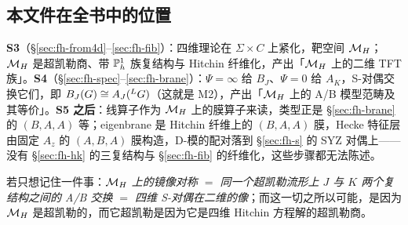 \subsection*{本文件在全书中的位置}
\noindent\textbf{S3}（\S\ref{sec:fh-from4d}--\ref{sec:fh-fib}）：四维理论在 $\Sigma\times C$ 上紧化，靶空间 $\mathcal{M}_H$；$\mathcal{M}_H$ 是超凯勒商、带 $\mathbb{P}^1_h$ 族复结构与 Hitchin 纤维化，产出「$\mathcal{M}_H$ 上的二维 TFT 族」。\textbf{S4}（\S\ref{sec:fh-spec}--\ref{sec:fh-brane}）：$\Psi=\infty$ 给 $B_J$、$\Psi=0$ 给 $A_K$，S-对偶交换它们，即 $B_J(G)\cong A_J({}^{L}G)$（这就是 M2），产出「$\mathcal{M}_H$ 上的 A/B 模型范畴及其等价」。\textbf{S5 之后}：线算子作为 $\mathcal{M}_H$ 上的膜算子来读，类型正是 \S\ref{sec:fh-brane} 的 $(B,A,A)$ 等；eigenbrane 是 Hitchin 纤维上的 $(B,A,A)$ 膜，Hecke 特征层由固定 $A_z$ 的 $(A,B,A)$ 膜构造，D-模的配对落到 \S\ref{sec:fh-s} 的 SYZ 对偶上——没有 \S\ref{sec:fh-hk} 的三复结构与 \S\ref{sec:fh-fib} 的纤维化，这些步骤都无法陈述。

若只想记住一件事：\emph{$\mathcal{M}_H$ 上的镜像对称 $=$ 同一个超凯勒流形上 $J$ 与 $K$ 两个复结构之间的 A/B 交换 $=$ 四维 S-对偶在二维的像}；而这一切之所以可能，是因为 $\mathcal{M}_H$ 是超凯勒的，而它超凯勒是因为它是四维 Hitchin 方程解的超凯勒商。
